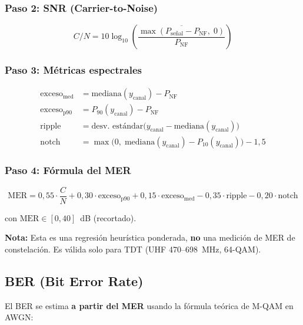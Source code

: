 \documentclass[11pt,a4paper]{article}
\begin{document}
\subsubsection{Paso 2: SNR (Carrier-to-Noise)}

\begin{equation}
C/N = 10\log_{10}\!\left(\frac{\overline{\max(P_{\text{señal}} - P_{\text{NF}},\; 0)}}{P_{\text{NF}}}\right)
\label{eq:cn}
\end{equation}

\subsubsection{Paso 3: Métricas espectrales}

\begin{align}
\text{exceso}_{\text{med}} &= \text{mediana}(y_{\text{canal}}) - P_{\text{NF}} \\
\text{exceso}_{\text{p90}} &= P_{90}(y_{\text{canal}}) - P_{\text{NF}} \\
\text{ripple} &= \text{desv. estándar}\big(y_{\text{canal}} - \text{mediana}(y_{\text{canal}})\big) \\
\text{notch} &= \max\!\big(0,\; \text{mediana}(y_{\text{canal}}) - P_{10}(y_{\text{canal}})\big) - 1{,}5
\label{eq:metrics}
\end{align}

\subsubsection{Paso 4: Fórmula del MER}

\begin{equation}
\boxed{
\text{MER} = 0{,}55 \cdot \frac{C}{N} + 0{,}30 \cdot \text{exceso}_{\text{p90}} + 0{,}15 \cdot \text{exceso}_{\text{med}} - 0{,}35 \cdot \text{ripple} - 0{,}20 \cdot \text{notch}
}
\label{eq:mer}
\end{equation}

con $\text{MER} \in [0, 40]$~dB (recortado).

\textbf{Nota:} Esta es una regresión heurística ponderada, \textbf{no} una medición de MER de constelación. Es válida solo para TDT (UHF 470--698~MHz, 64-QAM).

\subsection{BER (Bit Error Rate)}

El BER se estima \textbf{a partir del MER} usando la fórmula teórica de M-QAM en AWGN:
\end{document}
